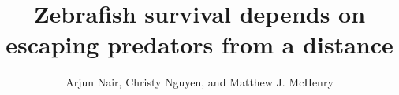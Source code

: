 \documentclass[]{rsos}%
\begin{document}
\title{Zebrafish survival depends on escaping predators from a distance}

\author{%
Arjun Nair, Christy Nguyen, and Matthew J. McHenry}

\address{Department of Ecology and Evolutionary Biology\\
University of California, Irvine\\
321 Steinhaus Hall\\
Irvine, CA 92697}

\subject{Animal behavior, biomechanics}






\maketitle




\linespread{1.6}\selectfont %
\end{document}
